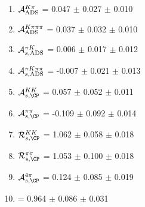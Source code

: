 \begin{enumerate}
\item $\mathcal{A}_{\rm ADS}^{K\pi}$ = 0.047 $\pm$ 0.027 $\pm$ 0.010
\item $\mathcal{A}_{\rm ADS}^{K\pi\pi\pi}$ = 0.037 $\pm$ 0.032 $\pm$ 0.010
\item $\mathcal{A}_{s,\rm ADS}^{\pi K}$ = 0.006 $\pm$ 0.017 $\pm$ 0.012
\item $\mathcal{A}_{s,\rm ADS}^{\pi K\pi\pi}$ = -0.007 $\pm$ 0.021 $\pm$ 0.013
\item $\mathcal{A}_{s,\CP}^{KK}$ = 0.057 $\pm$ 0.052 $\pm$ 0.011
\item $\mathcal{A}_{s,\CP}^{\pi\pi}$ = -0.109 $\pm$ 0.092 $\pm$ 0.014
\item $\mathcal{R}_{s,\CP}^{KK}$ = 1.062 $\pm$ 0.058 $\pm$ 0.018
\item $\mathcal{R}_{s,\CP}^{\pi\pi}$ = 1.053 $\pm$ 0.100 $\pm$ 0.018
\item $\mathcal{A}_{s,\CP}^{4\pi}$ = 0.124 $\pm$ 0.085 $\pm$ 0.019
\item  = 0.964 $\pm$ 0.086 $\pm$ 0.031
\end{enumerate}
